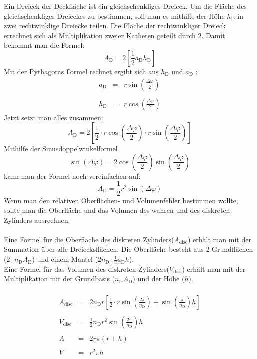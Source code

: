 \documentclass[Protokollheft.tex]{subfiles}
\begin{document}
	\noindent
	Ein Dreieck der Deckfläche ist ein gleichschenkliges Dreieck. Um die Fläche des gleichschenkliges Dreieckes zu bestimmen, soll man es mithilfe der Höhe  $h_\text{D}$ in zwei rechtwinklige Dreiecke teilen. Die Fläche der rechtwinkliger Dreieck errechnet sich als Multiplikation zweier Katheten geteilt durch $2$. Damit bekommt man die Formel: 
	$$ A_\text{D} = 2 \left[\frac12 a_\text{D} h_\text{D}\right]$$
	Mit der Pythagoras Formel rechnet ergibt sich aus $h_\text{D}$ und $a_\text{D}$ :
	\begin{eqnarray*}
		a_\text{D}&=&r \sin\left(\frac{\Delta \varphi}{2}\right)\\
		\\
		h_\text{D}&=&r \cos\left(\frac{\Delta \varphi}{2}\right)
	\end{eqnarray*}
	Jetzt setzt man alles zusammen:
	$$A_\text{D} = 2 \left[ \frac12 \cdot r \cos\left(\frac{\Delta \varphi}{2}\right)\cdot r \sin\left(\frac{\Delta \varphi}{2}\right)  \right]$$
	Mithilfe der Sinusdoppelwinkelformel
	$$  \sin(\Delta\varphi)=2 \cos\left(\frac{\Delta \varphi}{2}\right) \sin\left(\frac{\Delta \varphi}{2}\right)  $$
	kann man der Formel noch vereinfachen auf:
	$$A_\text{D} =  \frac12 r^2 \sin(\Delta\varphi)$$
	\noindent
	Wenn man den relativen Oberflächen- und Volumenfehler bestimmen wollte, sollte man die Oberfläche und das Volumen des wahren und des diskreten Zylinders ausrechnen.
	\\
	\\
	Eine Formel für die Oberfläche des diskreten Zylinders($A_\text{disc}$) erhält man mit der Summation über alle Dreiecksflächen. Die Oberfläche besteht aus 2 Grundflächen ($2\cdot n_\text{D}A_\text{D}$) und einem Mantel ($2n_\text{D}\cdot\frac12  a_\text{D}h$).\\
	Eine Formel für das Volumen des diskreten Zylinders($V_\text{disc}$) erhält man mit der Multiplikation mit der Grundbasis ($ n_\text{D}A_\text{D}$) und der Höhe ($h$).\\
	\\  
	\begin{eqnarray*}
		A_\text{disc}&=&2n_\text{D}r\left[ \frac12 \cdot r \sin\left(\frac{2 \pi}{n_\text{D}}\right)+ \sin\left(\frac{\pi}{n_\text{D}}\right)h  \right]\\
	    \\
		V_\text{disc}&=&\frac12 n_\text{D} r^2 \sin\left(\frac{ 2\pi}{n_\text{D}}\right)h\\
		\\
		A&=&2 r \pi (r+h)\\
		\\
		V&=&r^2\pi h
	\end{eqnarray*}
\end{document}
